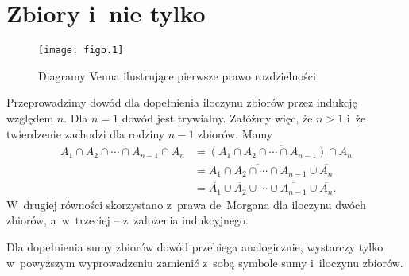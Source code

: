 \chapter{Zbiory i~nie tylko}


\exercise %
\begin{figure}[ht]
	\begin{center}
		\texttt{[image: figb.1]}
	\end{center}
	\caption{Diagramy Venna ilustrujące pierwsze prawo rozdzielności}
\end{figure}

\exercise %
Przeprowadzimy dowód dla dopełnienia iloczynu zbiorów przez indukcję względem $n$. Dla $n=1$ dowód jest trywialny. Załóżmy więc, że $n>1$ i~że twierdzenie zachodzi dla rodziny $n-1$ zbiorów. Mamy
\begin{align*}
	\overline{A_1\cap A_2\cap\cdots\cap A_{n-1}\cap A_n} &= \overline{(A_1\cap A_2\cap\cdots\cap A_{n-1})\cap A_n} \\
	&= \overline{A_1\cap A_2\cap\cdots\cap A_{n-1}}\cup\overline{A_n} \\
	&= \overline{A_1}\cup\overline{A_2}\cup\cdots\cup\overline{A_{n-1}}\cup\overline{A_n}.
\end{align*}
W~drugiej równości skorzystano z~prawa de~Morgana dla iloczynu dwóch zbiorów, a~w~trzeciej -- z~założenia indukcyjnego.

Dla dopełnienia sumy zbiorów dowód przebiega analogicznie, wystarczy tylko w~powyższym wyprowadzeniu zamienić z~sobą symbole sumy i~iloczynu zbiorów.

